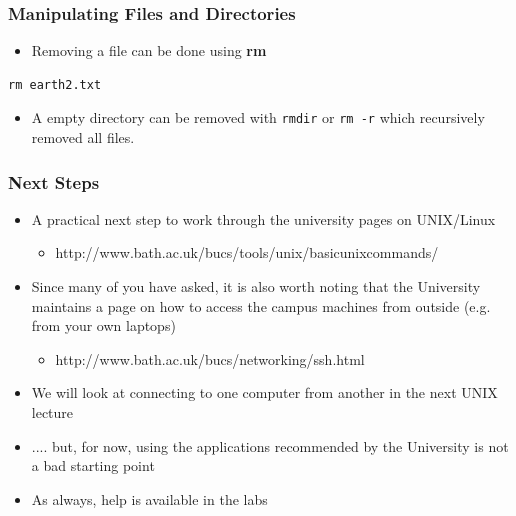 \documentclass{beamer}
\begin{document}
\begin{frame}[fragile]\frametitle{Manipulating Files and Directories}
\begin{itemize}
\item Removing a file can be done using \textbf{rm}
\end{itemize}

\begin{block}{}
\begin{lstlisting}[linewidth=5cm]
rm earth2.txt
\end{lstlisting}
\end{block}
\bigskip
\begin{itemize}
\item A empty directory can be removed with \lstinline!rmdir! or \lstinline!rm -r! which recursively removed all files.
\end{itemize}
\end{frame}

\begin{frame}[fragile]\frametitle{Next Steps}
\begin{itemize}
\item A practical next step to work through the university pages on UNIX/Linux
\begin{itemize}
\item http://www.bath.ac.uk/bucs/tools/unix/basicunixcommands/
\end{itemize}
\item Since many of you have asked, it is also worth noting that the University maintains a page on how to access the campus machines from outside (e.g. from your own laptops)
\begin{itemize}
\item http://www.bath.ac.uk/bucs/networking/ssh.html
\end{itemize}
\item We will look at connecting to one computer from another in the next UNIX lecture
\item .... but, for now, using the applications recommended by the University is not a bad starting point
\item As always, help is available in the labs

\end{itemize}
\end{frame}
\end{document}

